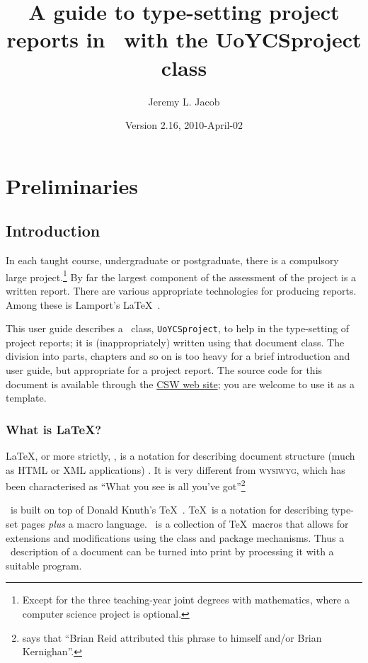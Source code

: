 \documentclass[authoryearcitations]{UoYCSproject}
\author{Jeremy L. Jacob}
\title{A guide to type-setting project reports in \LaTeXe\ with the
  \textsf{UoYCSproject} class}
\date{Version 2.16, 2010-April-02}
\begin{document}
\maketitle
\listoffigures
\listoftables
\renewcommand*{\lstlistlistingname}{List of Listings}
\lstlistoflistings

\cleardoublepage
\part{Preliminaries}
\label{sec:start}
\thispagestyle{empty}\cleardoublepage

\chapter{Introduction}
\label{cha:Introduction}

In each taught course, undergraduate or postgraduate, there is a
compulsory large project.\footnote{Except for the three teaching-year
  joint degrees with mathematics, where a computer science project is
  optional.}  By far the largest component of the assessment of the
project is a written report.  There are various appropriate
technologies for producing reports.  Among these is Lamport's \LaTeX\ 
\citep{Lamport1994}.

This user guide describes a \LaTeXe\ class, \lstinline|UoYCSproject|,
to help in the type-setting of project reports; it is
(inappropriately) written using that document class.  The division
into parts, chapters and so on is too heavy for a brief introduction
and user guide, but appropriate for a project report.  The source code
for this document is available through the
\href{http://www-course.cs.york.ac.uk/csw/}{CSW web site}; you are
welcome to use it as a template.

\section{What is \LaTeX?}
\label{sec:whatislatex}

\LaTeX, or more strictly, \LaTeXe, is a notation for describing
document structure (much as HTML or XML applications)
\citep{Lamport1994}.  It is very different from \textsc{wysiwyg},
which has been characterised as ``What you see is all you've
got''\footnote{\citet[p7, Footnote~1]{Lamport1994} says that ``Brian
  Reid attributed this phrase to himself and/or Brian Kernighan''.}

\LaTeXe\ is built on top of Donald Knuth's \TeX\ \citep{Knuth1984}.
\TeX\ is a notation for describing type-set pages \emph{plus} a macro
language.  \LaTeXe\ is a collection of \TeX\ macros that allows for
extensions and modifications using the class and package mechanisms.
Thus a \LaTeXe\ description of a document can be turned into print by
processing it with a suitable program.
\end{document}

